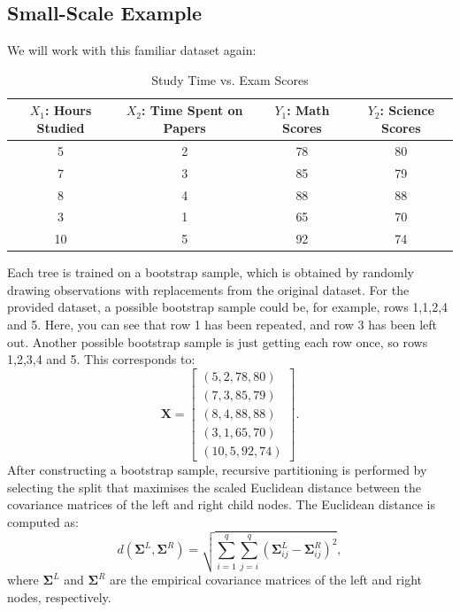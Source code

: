 \documentclass[11pt]{report} %
\begin{document}
\subsection{Small-Scale Example}
We will work with this familiar dataset again:
\setlength{\tabcolsep}{4pt} %
\begin{table}[H]
    \centering
    \begin{tabular}{|c|c|c|c|}
        \hline
        \( X_1 \): Hours Studied & \( X_2 \): Time Spent on Papers & \( Y_1 \): Math Scores & \( Y_2 \): Science Scores\\
        \hline
        5  & 2  & 78 & 80 \\
        7  & 3  & 85 & 79 \\
        8  & 4  & 88 & 88 \\
        3  & 1  & 65 & 70 \\
        10 & 5  & 92 & 74 \\
        \hline
    \end{tabular}
    \caption{Study Time vs. Exam Scores}
    \label{tab:study_scores5}
\end{table}

\noindent Each tree is trained on a bootstrap sample, which is obtained by randomly drawing observations with replacements from the original dataset. 
For the provided dataset, a possible bootstrap sample could be, for example, rows 1,1,2,4 and 5. Here, you can see that row 1 has been repeated, and row 3 has been left out. Another possible bootstrap sample is just getting each row once, so rows 1,2,3,4 and 5. This corresponds to:
\[
\mathbf{X} = 
\begin{bmatrix} 
(5,2,78,80) \\
(7,3,85,79) \\
(8,4,88,88) \\
(3,1,65,70) \\
(10,5,92,74) 
\end{bmatrix}.
\]
After constructing a bootstrap sample, recursive partitioning is performed by selecting the split that maximises the scaled Euclidean distance between the covariance matrices of the left and right child nodes. The Euclidean distance is computed as:
\begin{equation}
d(\mathbf{\Sigma}^L, \mathbf{\Sigma}^R) = \sqrt{\sum_{i=1}^{q} \sum_{j=i}^{q} (\mathbf{\Sigma}^L_{ij} - \mathbf{\Sigma}^R_{ij})^2},    
\end{equation}
\noindent where \( \mathbf{\Sigma}^L \) and \( \mathbf{\Sigma}^R \) are the empirical covariance matrices of the left and right nodes, respectively. 
\end{document}
